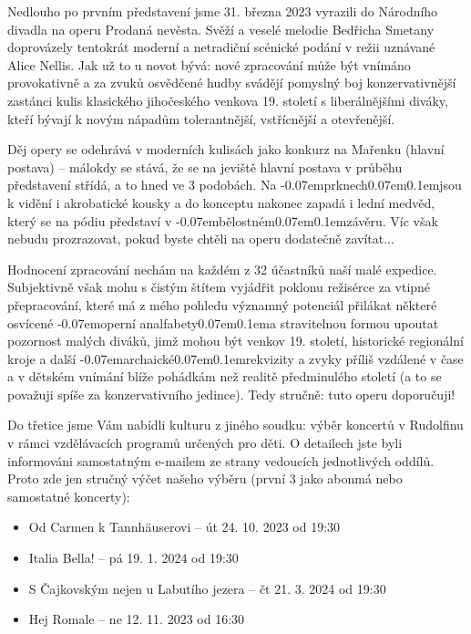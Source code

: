 \documentclass[11pt]{article}
\newcommand{\luv}{\clqq\kern-0.07em}
\newcommand{\ruv}{\kern0.07em\crqq\kern0.1em}
\begin{document}
Nedlouho po prvním představení jsme 31. března 2023 vyrazili do Národního divadla na operu Prodaná nevěsta. Svěží a veselé melodie Bedřicha Smetany doprovázely tentokrát moderní a netradiční scénické podání v režii uznávané Alice Nellis. Jak už to u novot bývá: nové zpracování může být vnímáno provokativně a za zvuků osvědčené hudby svádějí pomyslný boj konzervativnější zastánci kulis klasického jihočeského venkova 19. století s liberálnějšími diváky, kteří bývají k novým nápadům tolerantnější, vstřícnější a otevřenější.

Děj opery se odehrává v moderních kulisách jako konkurz na Mařenku (hlavní postava) – málokdy se stává, že se na jeviště hlavní postava v průběhu představení střídá, a to hned ve 3 podobách. Na \luv prknech\ruv jsou k vidění i akrobatické kousky a do konceptu nakonec zapadá i lední medvěd, který se na pódiu představí v \luv bělostném\ruv závěru. Víc však nebudu prozrazovat, pokud byste chtěli na operu dodatečně zavítat...

Hodnocení zpracování nechám na každém z 32 účastníků naší malé expedice. Subjektivně však mohu s čistým štítem vyjádřit poklonu režisérce za vtipné přepracování, které má z mého pohledu významný potenciál přilákat některé osvícené \luv operní analfabety\ruv a stravitelnou formou upoutat pozornost malých diváků, jimž mohou být venkov 19. století, historické regionální kroje a další \luv archaické\ruv rekvizity a zvyky příliš vzdálené v čase a v dětském vnímání blíže pohádkám než realitě předminulého století (a to se považuji spíše za konzervativního jedince). Tedy stručně: tuto operu doporučuji!

Do třetice jsme Vám nabídli kulturu z jiného soudku: výběr koncertů v Rudolfinu v rámci vzdělávacích programů určených pro děti. O detailech jste byli informováni samostatným e-mailem ze strany vedoucích jednotlivých oddílů. Proto zde jen stručný výčet našeho výběru (první 3 jako abonmá nebo samostatné koncerty):

\renewcommand{\arraystretch}{1}
\begin{itemize}
  \setlength\itemsep{-3pt}
  \item Od Carmen k Tannhäuserovi – út 24. 10. 2023 od 19:30
  \item Italia Bella! – pá 19. 1. 2024 od 19:30
  \item S Čajkovským nejen u Labutího jezera – čt 21. 3. 2024 od 19:30
  \item Hej Romale – ne 12. 11. 2023 od 16:30
\end{itemize}
\end{document}
